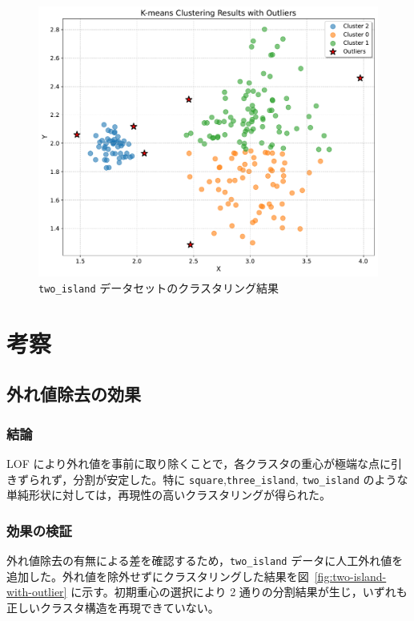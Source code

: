 \documentclass[a4j,dvipdfmx]{jsarticle}
\begin{document}
\begin{figure}[H]
  \centering
  \includegraphics[width=.4\textwidth]{two_island_output_plot.pdf}
  \caption{\texttt{two\_island} データセットのクラスタリング結果}
  \label{fig:two-island}
\end{figure}

\section{考察}
\label{sec:discussion}
\subsection{外れ値除去の効果}
\subsubsection{結論}
LOF により外れ値を事前に取り除くことで，各クラスタの重心が極端な点に引きずられず，分割が安定した。特に \texttt{square},\texttt{three\_island}, \texttt{two\_island} のような単純形状に対しては，再現性の高いクラスタリングが得られた。

\subsubsection{効果の検証}
外れ値除去の有無による差を確認するため，\texttt{two\_island} データに人工外れ値を追加した。外れ値を除外せずにクラスタリングした結果を図~\ref{fig:two-island-with-outlier} に示す。初期重心の選択により 2 通りの分割結果が生じ，いずれも正しいクラスタ構造を再現できていない。
\end{document}
